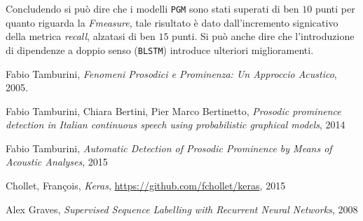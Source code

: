 \documentclass[twoside,twocolumn,10pt]{extarticle}
\theoremstyle{definition}
\begin{document}
	Concludendo si può dire che i modelli \texttt{PGM} sono stati superati di ben $10$ punti per quanto riguarda la \textit{Fmeasure}, tale risultato è dato dall'incremento signicativo della metrica \textit{recall}, alzatasi di ben $15$ punti. Si può anche dire che l'introduzione di dipendenze a doppio senso (\texttt{BLSTM}) introduce ulteriori miglioramenti.
		
\begin{thebibliography}{99}	
		Fabio Tamburini,
		\newblock \emph{Fenomeni Prosodici e Prominenza: Un Approccio Acustico},
		2005.

		Fabio Tamburini, Chiara Bertini, Pier Marco Bertinetto,
		\newblock \emph{Prosodic prominence detection in Italian continuous speech using probabilistic graphical models},
		2014

		Fabio Tamburini,
		\newblock \emph{Automatic Detection of Prosodic Prominence by Means of Acoustic Analyses},
		2015

		Chollet, Fran\c{c}ois,
		\newblock \emph{Keras},
		\url{https://github.com/fchollet/keras},
		2015

		Alex Graves,
		\newblock \emph{Supervised Sequence Labelling with Recurrent Neural Networks},
		2008
\end{thebibliography}
\end{document}
